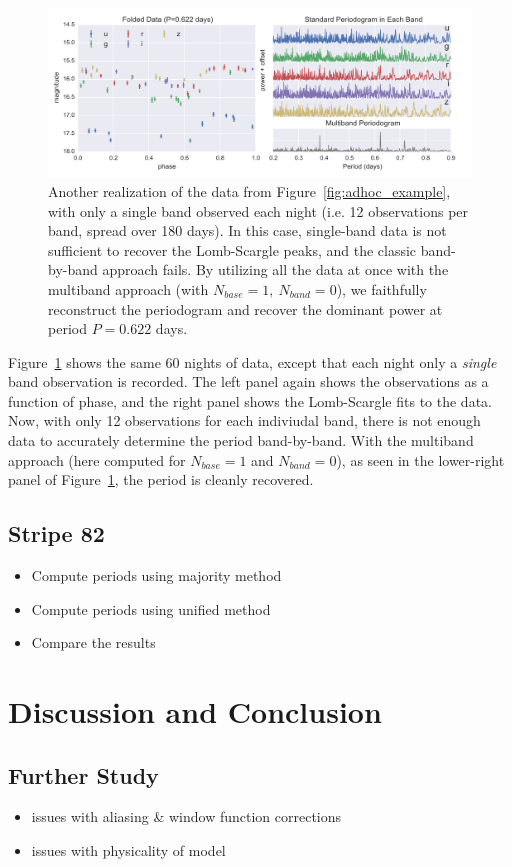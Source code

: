 \documentclass[12pt,preprint]{aastex}
\newcommand{\Fig}[1]{Figure~\ref{fig:#1}}
\newcommand{\fig}[1]{\Fig{#1}}
\newcommand{\figlabel}[1]{\label{fig:#1}}
\begin{document}
\begin{figure}
  \centering
  \includegraphics[width=\textwidth]{fig05.pdf}
  \caption{
    Another realization of the data from \fig{adhoc_example}, with only a single
    band observed each night (i.e. 12 observations per band, spread over 180
    days). In this case, single-band data is not sufficient to recover the
    Lomb-Scargle peaks, and the classic band-by-band approach fails.
    By utilizing all the data at once with the multiband approach
    (with $N_{base}=1,~N_{band}=0$),
    we faithfully reconstruct the periodogram and recover
    the dominant power at period $P=0.622$ days.
  } 
  \figlabel{multi_example}
\end{figure}

\fig{multi_example} shows the same 60 nights of data, except that each night only a {\it single} band observation is recorded. The left panel again shows the observations as a function of phase, and the right panel shows the Lomb-Scargle fits to the data. Now, with only 12 observations for each indiviudal band, there is not enough data to accurately determine the period band-by-band. With the multiband approach (here computed for $N_{base}=1$ and $N_{band}=0$), as seen in the lower-right panel of \fig{multi_example}, the period is cleanly recovered.


\subsection{Stripe 82}

\begin{itemize}
  \item Compute periods using majority method
  \item Compute periods using unified method
  \item Compare the results
\end{itemize}

\section{Discussion and Conclusion}

\subsection{Further Study}
\begin{itemize}
  \item issues with aliasing \& window function corrections
  \item issues with physicality of model
\end{itemize}





\end{document}
